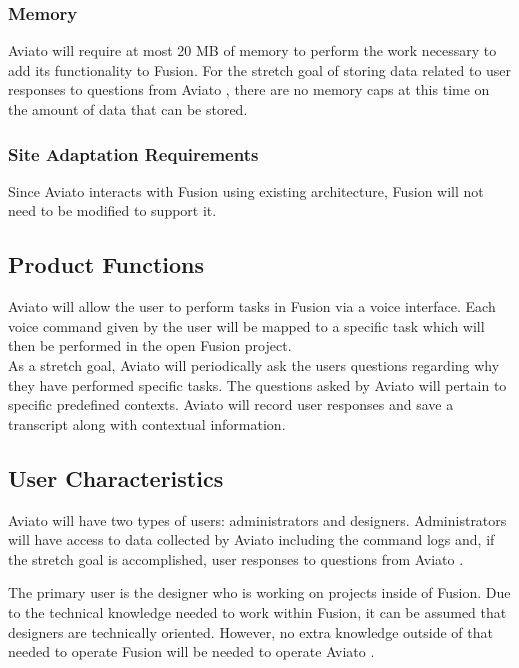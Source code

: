 \documentclass[onecolumn, draftclsnofoot,10pt, compsoc]{IEEEtran}
\def \botname{Aviato }
\def \totalMemoryRequirement{20 MB }
\begin{document}
        \subsubsection{Memory} 
            \botname will require at most \totalMemoryRequirement of memory to perform the work necessary to add its functionality to Fusion.
            For the stretch goal of storing data related to user responses to questions from \botname, there are no memory caps at this time on the amount of data that can be stored.


        \subsubsection{Site Adaptation Requirements} 
            Since \botname interacts with Fusion using existing architecture, Fusion will not need to be modified to support it. 

    \subsection{Product Functions}
        \botname will allow the user to perform tasks in Fusion via a voice interface. 
        Each voice command given by the user will be mapped to a specific task which will then be performed in the open Fusion project. \\
       
        As a stretch goal, \botname will periodically ask the users questions regarding why they have performed specific tasks.
        The questions asked by \botname will pertain to specific predefined contexts.
		\botname will record user responses and save a transcript along with contextual information.
        
    \subsection{User Characteristics}
		\botname will have two types of users: administrators and designers. 
		Administrators will have access to data collected by \botname including the command logs and, if the stretch goal is accomplished, user responses to questions from \botname. 
		
		The primary user is the designer who is working on projects inside of Fusion. 
        Due to the technical knowledge needed to work within Fusion, it can be assumed that designers are technically oriented.
        However, no extra knowledge outside of that needed to operate Fusion will be needed to operate \botname.
        
\end{document}
